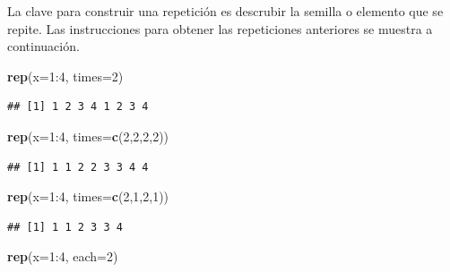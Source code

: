 \documentclass[10pt,]{krantz}
\makeatletter
\newenvironment{Shaded}{\begin{snugshade}}{\end{snugshade}}
\newcommand{\KeywordTok}[1]{\textcolor[rgb]{0.13,0.29,0.53}{\textbf{{#1}}}}
\newcommand{\DataTypeTok}[1]{\textcolor[rgb]{0.13,0.29,0.53}{{#1}}}
\newcommand{\DecValTok}[1]{\textcolor[rgb]{0.00,0.00,0.81}{{#1}}}
\newcommand{\NormalTok}[1]{{#1}}
\newenvironment{kframe}{%
\medskip{}
\setlength{\fboxsep}{.8em}
 \def\at@end@of@kframe{}%
 \ifinner\ifhmode%
  \def\at@end@of@kframe{\end{minipage}}%
  \begin{minipage}{\columnwidth}%
 \fi\fi%
 \def\FrameCommand##1{\hskip\@totalleftmargin \hskip-\fboxsep
 \colorbox{shadecolor}{##1}\hskip-\fboxsep
     \hskip-\linewidth \hskip-\@totalleftmargin \hskip\columnwidth}%
 \MakeFramed {\advance\hsize-\width
   \@totalleftmargin\z@ \linewidth\hsize
   \@setminipage}}%
 {\par\unskip\endMakeFramed%
 \at@end@of@kframe}
\renewenvironment{Shaded}{\begin{kframe}}{\end{kframe}}
\makeatother
\begin{document}
La clave para construir una repetición es descrubir la semilla o
elemento que se repite. Las instrucciones para obtener las repeticiones
anteriores se muestra a continuación.

\begin{Shaded}
\begin{Highlighting}[]
\KeywordTok{rep}\NormalTok{(}\DataTypeTok{x=}\DecValTok{1}\NormalTok{:}\DecValTok{4}\NormalTok{, }\DataTypeTok{times=}\DecValTok{2}\NormalTok{)}
\end{Highlighting}
\end{Shaded}

\begin{verbatim}
## [1] 1 2 3 4 1 2 3 4
\end{verbatim}

\begin{Shaded}
\begin{Highlighting}[]
\KeywordTok{rep}\NormalTok{(}\DataTypeTok{x=}\DecValTok{1}\NormalTok{:}\DecValTok{4}\NormalTok{, }\DataTypeTok{times=}\KeywordTok{c}\NormalTok{(}\DecValTok{2}\NormalTok{,}\DecValTok{2}\NormalTok{,}\DecValTok{2}\NormalTok{,}\DecValTok{2}\NormalTok{))}
\end{Highlighting}
\end{Shaded}

\begin{verbatim}
## [1] 1 1 2 2 3 3 4 4
\end{verbatim}

\begin{Shaded}
\begin{Highlighting}[]
\KeywordTok{rep}\NormalTok{(}\DataTypeTok{x=}\DecValTok{1}\NormalTok{:}\DecValTok{4}\NormalTok{, }\DataTypeTok{times=}\KeywordTok{c}\NormalTok{(}\DecValTok{2}\NormalTok{,}\DecValTok{1}\NormalTok{,}\DecValTok{2}\NormalTok{,}\DecValTok{1}\NormalTok{))}
\end{Highlighting}
\end{Shaded}

\begin{verbatim}
## [1] 1 1 2 3 3 4
\end{verbatim}

\begin{Shaded}
\begin{Highlighting}[]
\KeywordTok{rep}\NormalTok{(}\DataTypeTok{x=}\DecValTok{1}\NormalTok{:}\DecValTok{4}\NormalTok{, }\DataTypeTok{each=}\DecValTok{2}\NormalTok{)}
\end{Highlighting}
\end{Shaded}
\end{document}
